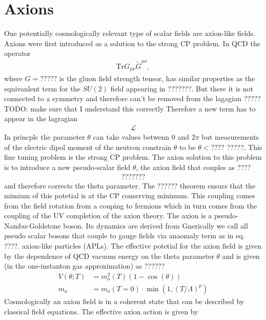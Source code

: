 \documentclass[13pt,a4paper,twoside,titlepage]{article}
\begin{document}
\section{Axions}
\label{sec:axions}

One potentially cosmologically relevant type of scalar fields are axion-like fields.
Axions were first introduced as a solution to the strong CP problem.
In QCD the operator
\begin{align}
    \mathrm{Tr} G_{\mu \nu} \tilde{G}^{\mu \nu},
\end{align}
where $G = ?????$ is the gluon field strength tensor,
has similar properties as the equivanlent term for the $SU(2)$ field appearing
in ???????. But there it is not connected to a symmetry and therefore can't
be removed from the lagagian ????? TODO: make sure that I understand this correctly
Therefore a new term has to appear in the lagragian
\begin{align}
    \mathcal{L}
\end{align}
In princple the parameter $\theta$ can take values betwenn 0 and $2\pi$ but measurements of the electric dipol moment of the neutron constrain $\theta$ to
be $\theta < ????$ ?????.
This fine tuning problem is the strong CP problem.
The axion solution to this problem is to introduce a new pseudo-scalar field
$\theta$, the axion field that couples as ????
\begin{align}
    ???????
\end{align}
and therefore corrects the theta parameter. The ?????? theorem ensurs that
the mimium of this potetial is at the CP conserving minimum.
This coupling comes from the field rotation from a couping to fermions which in turn comes from
the coupling of the UV completion of the axion theory.
The axion is a pseudo-Nambu-Goldstone boson. Its dynamics are derived from
Gnerically we call all pseudo scalar bosons that couple to gauge fields via anaomaly term as in eq. ????.
axion-like particles (APLs).
The effective potetial for the axion field is given by the dependence of QCD vacuum energy
on the theta parameter $\theta$ and is given (in the one-instanton gas approximation) as ??????
\begin{align}
    V(\theta; T) &= m_a^2(T) (1 - \cos(\theta)) \\
    m_a &= m_a(T = 0) \cdot \min\left(1, \left( T / \Lambda \right)^p \right)
\end{align}
Cosmologically an axion field is in a coherent state that can be described by classical field equations.
The effective axion action is given by
\end{document}
